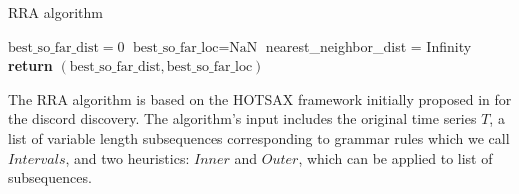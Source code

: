 \documentclass{sig-alternate}
\begin{document}
\noindent\begin{minipage}{82mm}
\begin{algorithm}[H]
\small
\caption{RRA algorithm}\label{algorithm2}
\begin{algorithmic}[1]
 \State $\text{best\_so\_far\_dist} = 0 $
 \State $\text{best\_so\_far\_loc} = \text{NaN} $
    \State nearest\_neighbor\_dist = Infinity
           \EndIf 
           \EndIf 
       \EndIf 
       \EndIf          
    \EndFor
 \EndFor
 \State \textbf{return} $(\text{best\_so\_far\_dist}, \text{best\_so\_far\_loc})$
\EndFunction
\end{algorithmic}
\end{algorithm}
\vspace{-1em}
\vspace{2em}
\end{minipage}

The RRA algorithm is based on the HOTSAX framework initially proposed in \cite{hot_sax} for the discord discovery. The algorithm's input includes the original time series $T$, a list of variable length subsequences corresponding to grammar rules which we call $Intervals$, and two heuristics: $Inner$ and $Outer$, which can be applied to list of subsequences. 
\end{document}
